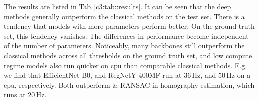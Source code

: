 


The results are listed in Tab.\,\ref{c3:tab::results}. It can be seen that the deep methods generally outperform the classical methods on the test set. There is a tendency that models with more parameters perform better. On the ground truth set, this tendency vanishes. The differences in performance become independent of the number of parameters. Noticeably, many backbones still outperform the classical methods across all thresholds on the ground truth set, and low compute regime models also run quicker on \gls{cpu} than comparable classical methods. E.g. we find that EfficientNet-B0, and RegNetY-400MF run at $36\,\text{Hz}$, and $50\,\text{Hz}$ on a \gls{cpu}, respectively. Both outperform  \& RANSAC in homography estimation, which runs at $20\,\text{Hz}$.


